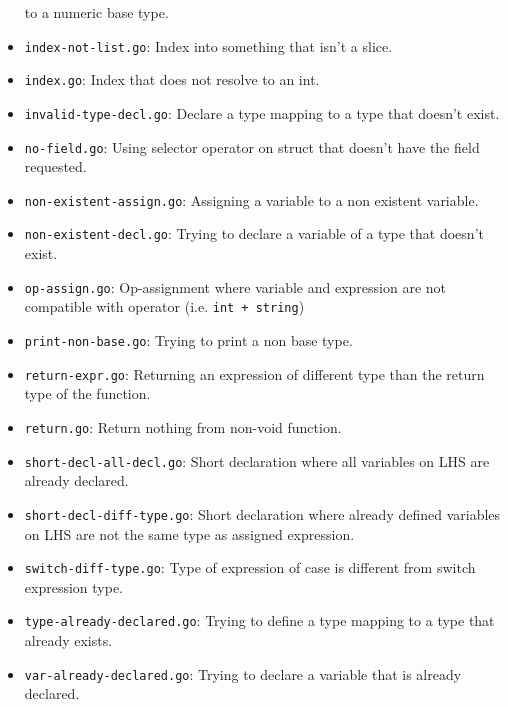 \documentclass[11pt]{article}
\begin{document}
\begin{itemize}
to a numeric base type.
\item \texttt{index-not-list.go}: Index into something that isn't a slice.
\item \texttt{index.go}: Index that does not resolve to an int.
\item \texttt{invalid-type-decl.go}: Declare a type mapping to a type that
doesn't exist.
\item \texttt{no-field.go}: Using selector operator on struct that doesn't have
the field requested.
\item \texttt{non-existent-assign.go}: Assigning a variable to a non existent
variable.
\item \texttt{non-existent-decl.go}: Trying to declare a variable of a type that
doesn't exist.
\item \texttt{op-assign.go}: Op-assignment where variable and expression are not
compatible with operator (i.e. \texttt{int + string})
\item \texttt{print-non-base.go}: Trying to print a non base type.
\item \texttt{return-expr.go}: Returning an expression of different type than the
return type of the function.
\item \texttt{return.go}: Return nothing from non-void function.
\item \texttt{short-decl-all-decl.go}: Short declaration where all variables on
LHS are already declared.
\item \texttt{short-decl-diff-type.go}: Short declaration where already defined
variables on LHS are not the same type as assigned expression.
\item \texttt{switch-diff-type.go}: Type of expression of case is different from
switch expression type.
\item \texttt{type-already-declared.go}: Trying to define a type mapping to a
type that already exists.
\item \texttt{var-already-declared.go}: Trying to declare a variable that is
already declared.
\end{itemize}
\end{document}
